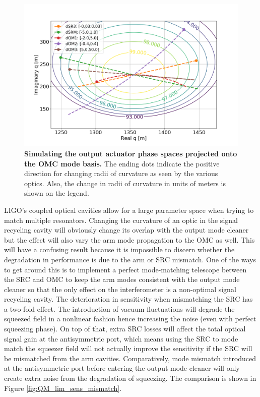 	\begin{figure}[ht!]
		\centering
		\includegraphics[width=0.9 \textwidth]{../Figures/OutputAct_Gouyphase.png}
		\caption[Simulating the output actuator phase spaces projected onto the OMC mode basis.]
		{\textbf{Simulating the output actuator phase spaces projected onto the OMC mode basis.} The ending dots indicate the positive direction for changing radii of curvature as seen by the various optics.  Also, the change in radii of curvature in units of meters is shown on the legend.
		}
		\label{fig:act_phase_space}
	\end{figure}
	
	LIGO's coupled optical cavities allow for a large parameter space when trying to match multiple resonators.   Changing the curvature of an optic in the signal recycling cavity will obviously change its overlap with the output mode cleaner but the effect will also vary the arm mode propagation to the OMC as well.  This will have a confusing result because it is impossible to discern whether the degradation in performance is due to the arm or SRC mismatch.  One of the ways to get around this is to implement a perfect mode-matching telescope between the SRC and OMC to keep the arm modes consistent with the output mode cleaner so that the only effect on the interferometer is a non-optimal signal recycling cavity.  The deterioration in sensitivity when mismatching the SRC has a two-fold effect. The introduction of vacuum fluctuations will degrade the squeezed field in a nonlinear fashion hence increasing the noise (even with perfect squeezing phase).  On top of that, extra SRC losses will affect the total optical signal gain at the antisymmetric port, which means using the SRC to mode match the squeezer field will not actually improve the sensitivity if the SRC will be mismatched from the arm cavities.  Comparatively, mode mismatch introduced at the antisymmetric port before entering the output mode cleaner will only create extra noise from the degradation of squeezing.  The comparison is shown in Figure \ref{fig:QM_lim_sens_mismatch}.
	
